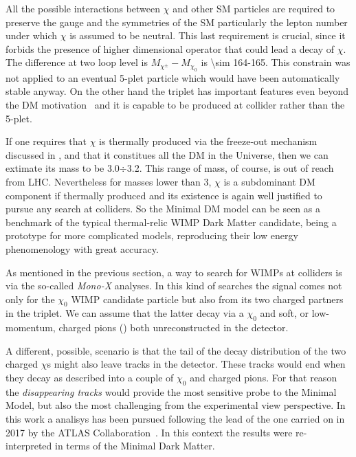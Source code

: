 All the possible interactions between $\chi$ and other SM particles are required to preserve the gauge and the symmetries of the SM particularly the lepton number under which $\chi$ is assumed to be neutral. This last requirement is crucial, since it forbids the presence of higher dimensional operator that could lead a decay of $\chi$.  The difference at two loop level is $M_{\chi^\pm} - M_{\chi_0}$ is  \SI{\sim 164}{}-\SI{165}{\mev}. This constrain was not applied to an eventual 5-plet particle which would have been automatically stable anyway. On the other hand the triplet has important features even beyond the DM motivation~\cite{Cirelli:paper} and it is capable to be produced at collider rather than the 5-plet.

If one requires that $\chi$ is thermally produced via the freeze-out mechanism discussed in \Sect{\ref{sec:wimp}}, and that it constitues all the DM in the Universe, then we can extimate its mass to be \SI{3.0}{}$\div$\SI{3.2}{\tev}. This range of mass, of course, is out of reach from LHC. Nevertheless for masses lower than \SI{3}{\tev}, $\chi$ is a subdominant DM component if thermally produced and its existence is again well justified to pursue any search at colliders. So the Minimal DM model can be seen as a benchmark of the typical thermal-relic WIMP Dark Matter candidate, being a prototype for more complicated models, reproducing their low energy phenomenology with great accuracy.

As mentioned in the previous section, a way to search for WIMPs at colliders is via the so-called \emph{Mono-X} analyses. In this kind of searches the signal comes not only for the $\chi_0$ WIMP candidate particle but also from its two charged partners in the triplet. We can assume that the latter decay via a $\chi_0$ and soft, or low-momentum, charged pions (\pipm) both unreconstructed in the detector. 

A different, possible, scenario is that the tail of the decay distribution of the two charged $\chi$s might also leave tracks in the detector. These tracks would end when they decay as described into a couple of $\chi_0$ and charged pions. For that reason the \emph{disappearing tracks} would provide the most sensitive probe to the Minimal Model, but also the most challenging from the experimental view perspective.
\enlargethispage{1\baselineskip}
\smallskip
In this work a \mph analisys has been pursued following the lead of the one carried on in 2017 by the ATLAS Collaboration~\cite{paperMP}. In this context the \mph results were re-interpreted in terms of the Minimal Dark Matter.










